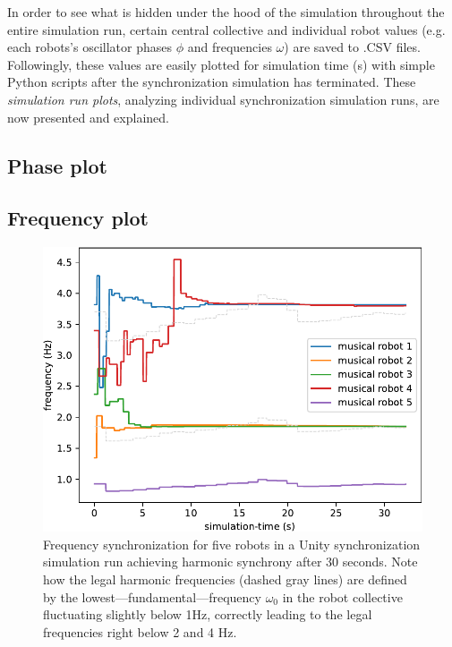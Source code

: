 
In order to see what is hidden under the hood of the simulation throughout the entire simulation run, certain central collective and individual robot values (e.g. each robots's oscillator phases $\phi$ and frequencies $\omega$) are saved to .CSV files. Followingly, these values are easily plotted for simulation time (s) with simple Python scripts after the synchronization simulation has terminated. These \textit{simulation run plots}, analyzing individual synchronization simulation runs, are now presented and explained.

	\subsection{Phase plot}


	\subsection{Frequency plot}
	\begin{figure}
		\centering
		\includegraphics[width=\linewidth]{Assets/DocSegments/Chapters/ExperimentsAndResults/Figures/Explanations/FrequencySynchronizationPlot.pdf}
		\caption[Simulation run plot: frequency plot.]{Frequency synchronization for five robots in a Unity synchronization simulation run achieving harmonic synchrony after 30 seconds. Note how the legal harmonic frequencies (dashed gray lines) are defined by the lowest—fundamental—frequency $\omega_0$ in the robot collective fluctuating slightly below 1Hz, correctly leading to the legal frequencies right below 2 and 4 Hz.}
		\label{fig:frequency_synch}
	\end{figure}


